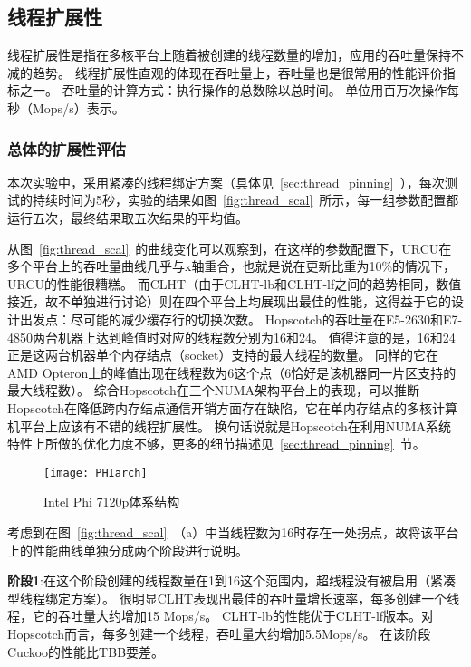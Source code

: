 \subsection{线程扩展性}

线程扩展性是指在多核平台上随着被创建的线程数量的增加，应用的吞吐量保持不减的趋势。
线程扩展性直观的体现在吞吐量上，吞吐量也是很常用的性能评价指标之一。
吞吐量的计算方式：执行操作的总数除以总时间。
单位用百万次操作每秒（Mops/s）表示。

\label{sec:thread_scal}
\subsubsection{总体的扩展性评估}

本次实验中，采用紧凑的线程绑定方案（具体见~\ref{sec:thread_pinning}~），每次测试的持续时间为5秒，实验的结果如图~\ref{fig:thread_scal}~所示，每一组参数配置都运行五次，最终结果取五次结果的平均值。

从图~\ref{fig:thread_scal}~的曲线变化可以观察到，在这样的参数配置下，URCU在多个平台上的吞吐量曲线几乎与x轴重合，也就是说在更新比重为10\%的情况下，URCU的性能很糟糕。
而CLHT（由于CLHT-lb和CLHT-lf之间的趋势相同，数值接近，故不单独进行讨论）则在四个平台上均展现出最佳的性能，这得益于它的设计出发点：尽可能的减少缓存行的切换次数。
Hopscotch的吞吐量在E5-2630和E7-4850两台机器上达到峰值时对应的线程数分别为16和24。
值得注意的是，16和24正是这两台机器单个内存结点（socket）支持的最大线程的数量。
同样的它在AMD Opteron上的峰值出现在线程数为6这个点（6恰好是该机器同一片区支持的最大线程数）。
综合Hopscotch在三个NUMA架构平台上的表现，可以推断Hopscotch在降低跨内存结点通信开销方面存在缺陷，它在单内存结点的多核计算机平台上应该有不错的线程扩展性。
换句话说就是Hopscotch在利用NUMA系统特性上所做的优化力度不够，更多的细节描述见~\ref{sec:thread_pinning}~节。

\begin{figure}[htbp]
\centering
\texttt{[image: PHIarch]}
\caption{Intel Phi 7120p体系结构}\label{fig:phi_arch}
\end{figure}

考虑到在图~\ref{fig:thread_scal}~（a）中当线程数为16时存在一处拐点，故将该平台上的性能曲线单独分成两个阶段进行说明。

\textbf{阶段1}:在这个阶段创建的线程数量在1到16这个范围内，超线程没有被启用（紧凑型线程绑定方案）。
很明显CLHT表现出最佳的吞吐量增长速率，每多创建一个线程，它的吞吐量大约增加15 Mops/s。
CLHT-lb的性能优于CLHT-lf版本。对Hopscotch而言，每多创建一个线程，吞吐量大约增加5.5Mops/s。 在该阶段Cuckoo的性能比TBB要差。

